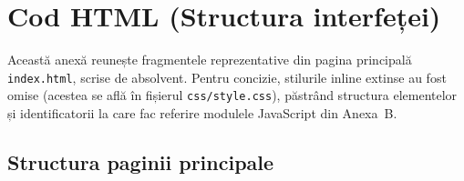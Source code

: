 

\chapter{Cod HTML (Structura interfeței)}
\label{anexa:html}

Această anexă reunește fragmentele reprezentative din pagina principală
\texttt{index.html}, scrise de absolvent. Pentru concizie, stilurile inline
extinse au fost omise (acestea se află în fișierul \texttt{css/style.css}),
păstrând structura elementelor și identificatorii la care fac referire
modulele JavaScript din Anexa~B.

\section*{Structura paginii principale}

